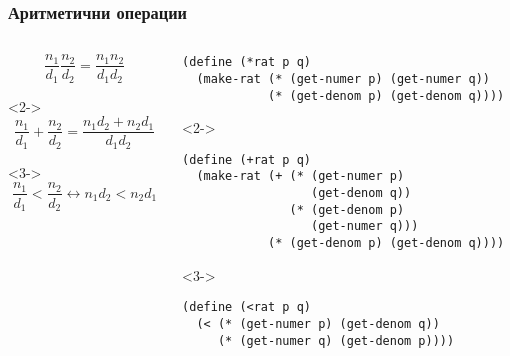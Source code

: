 \documentclass{beamer}
\begin{document}
\begin{frame}[fragile]
  \frametitle{Аритметични операции}

  \small
  \begin{columns}[t,onlytextwidth]
    \begin{column}{0.3\textwidth}
      \vspace{2em}
      \begin{equation*}
        \frac{n_1}{d_1}\frac{n_2}{d_2} = \frac{n_1n_2}{d_1d_2}
      \end{equation*}
      \vspace{4em}
      \begin{uncoverenv}<2->
        \begin{equation*}
          \frac{n_1}{d_1} + \frac{n_2}{d_2} = \frac{n_1d_2 + n_2d_1}{d_1d_2}
        \end{equation*}
      \end{uncoverenv}
      \vspace{4em}
      \begin{uncoverenv}<3->
        \begin{equation*}
          \frac{n_1}{d_1} < \frac{n_2}{d_2} \leftrightarrow n_1d_2 < n_2d_1
        \end{equation*}
      \end{uncoverenv}
    \end{column}

    \begin{column}{0.7\textwidth}
\begin{lstlisting}
(define (*rat p q)
  (make-rat (* (get-numer p) (get-numer q))
            (* (get-denom p) (get-denom q))))
\end{lstlisting}
      \begin{uncoverenv}<2->
\begin{lstlisting}
(define (+rat p q)
  (make-rat (+ (* (get-numer p)
                  (get-denom q))
               (* (get-denom p)
                  (get-numer q)))
            (* (get-denom p) (get-denom q))))
\end{lstlisting}
      \end{uncoverenv}
      \begin{uncoverenv}<3->
\begin{lstlisting}
(define (<rat p q)
  (< (* (get-numer p) (get-denom q))
     (* (get-numer q) (get-denom p))))
\end{lstlisting}
      \end{uncoverenv}
    \end{column}
  \end{columns}
\end{frame}
\end{document}
